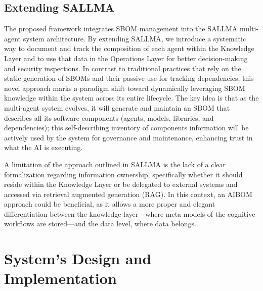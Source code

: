 \subsection{Extending SALLMA}
\label{sec:ext-sallma}


The proposed framework integrates SBOM management into the SALLMA multi-agent system architecture. By extending SALLMA, we introduce a systematic way to document and track the composition of each agent within the Knowledge Layer and to use that data in the Operations Layer for better decision-making and security inspections. In contrast to traditional practices that rely on the static generation of SBOMs and their passive use for tracking dependencies, this novel approach marks a paradigm shift toward dynamically leveraging SBOM knowledge within the system across its entire lifecycle. The key idea is that as the multi-agent system evolves, it will generate and maintain an SBOM that describes all its software components (agents, models, libraries, and dependencies); this self-describing inventory of components information will be actively used by the system for governance and maintenance, enhancing trust in what the AI is executing.

A limitation of the approach outlined in SALLMA is the lack of a clear formalization regarding information ownership, specifically whether it should reside within the Knowledge Layer or be delegated to external systems and accessed via retrieval augmented generation (RAG).
In this context, an AIBOM approach could be beneficial, as it allows a more proper and elegant differentiation between the knowledge layer—where meta-models of the cognitive workflows are stored—and the data level, where data belongs.






\section{System's Design and Implementation}\label{sec:design-and-implementation}

